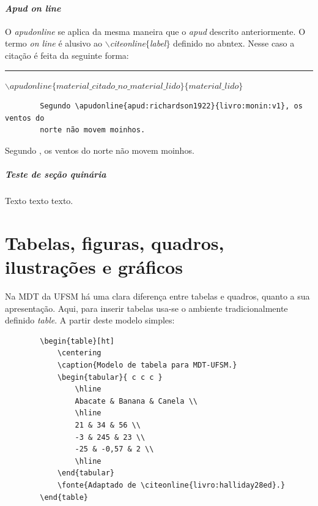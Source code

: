 	\subsubsection{\textit{Apud on line}}
	
	
	\par O \textit{apudonline} se aplica da mesma maneira que o \textit{apud} descrito anteriormente. O termo \textit{on line} é alusivo ao \textit{$\backslash$citeonline$\{$label$\}$} definido no abntex. Nesse caso a citação é feita da seguinte forma:
	\begin{center}
		\rule{0.5\textwidth}{1pt}
		$\backslash apudonline\{material\_citado\_no\_material\_lido\}\{material\_lido\}$ \\
	\end{center}
	
	\begin{verbatim}
		Segundo \apudonline{apud:richardson1922}{livro:monin:v1}, os ventos do
		norte não movem moinhos.
	\end{verbatim}
	
	Segundo , os ventos do norte não movem moinhos.
	
	\paragraph{Teste de seção quinária}
	
	\par Texto texto texto.
	
	
	\chapter{Tabelas, figuras, quadros, ilustrações e gráficos}
	
	\par Na MDT da UFSM há uma clara diferença entre tabelas e quadros, quanto a sua apresentação. Aqui, para inserir tabelas usa-se o ambiente tradicionalmente definido \textit{table}. A partir deste modelo simples:
	
	\begin{verbatim}
		\begin{table}[ht]
			\centering
			\caption{Modelo de tabela para MDT-UFSM.}
			\begin{tabular}{ c c c }
				\hline
				Abacate & Banana & Canela \\
				\hline
				21 & 34 & 56 \\
				-3 & 245 & 23 \\
				-25 & -0,57 & 2 \\
				\hline
			\end{tabular}
			\fonte{Adaptado de \citeonline{livro:halliday28ed}.}
		\end{table}
	\end{verbatim}
	
